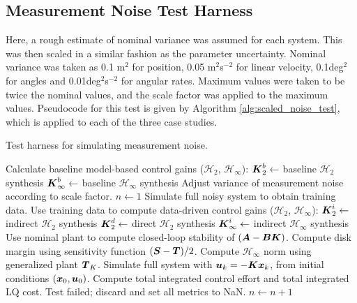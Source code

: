 \subsection{Measurement Noise Test Harness}
Here, a rough estimate of nominal variance was assumed for each system.  This was then scaled in a similar fashion as the parameter uncertainty.  Nominal variance was taken as 0.1 m$^{2}$ for position, 0.05 m$^{2}$s$^{-2}$ for linear velocity, 0.1deg$^{2}$ for angles and 0.01deg$^{2}$s$^{-2}$ for angular rates.  Maximum values were taken to be twice the nominal values, and the scale factor was applied to the maximum values.  Pseudocode for this test is given by Algorithm \ref{alg:scaled_noise_test}, which is applied to each of the three case studies.

\begin{algorithm}
\caption{Test harness for simulating measurement noise.}
\label{alg:scaled_noise_test}
\begin{algorithmic}
	\State Calculate baseline model-based control gains ($\mathcal{H}_{2}$, $\mathcal{H}_{\infty}$):
	\State \hspace{10pt} $\vb*{K}_{2}^{b} \gets $ baseline $\mathcal{H}_{2}$ synthesis
	\State \hspace{10pt} $\vb*{K}_{\infty}^{b} \gets $ baseline $\mathcal{H}_{\infty}$ synthesis
		\State Adjust variance of measurement noise according to scale factor.
		\State $n \gets 1$
			\State Simulate full noisy system to obtain training data.
			\State Use training data to compute data-driven control gains ($\mathcal{H}_{2}$, $\mathcal{H}_{\infty}$):
			\State \hspace{10pt} $\vb*{K}_{2}^{i} \gets $ indirect $\mathcal{H}_{2}$ synthesis
			\State \hspace{10pt} $\vb*{K}_{2}^{d} \gets $ direct $\mathcal{H}_{2}$ synthesis
			\State \hspace{10pt} $\vb*{K}_{\infty}^{i} \gets $ indirect $\mathcal{H}_{\infty}$ synthesis
				\State Use nominal plant to compute closed-loop stability of $(\vb*{A} - \vb*{B}\vb*{K})$.
					\State Compute disk margin using sensitivity function $(\vb*{S} - \vb*{T})/2$.
					\State Compute $\mathcal{H}_{\infty}$ norm using generalized plant $\vb*{T}_{K}$.
					\State Simulate full system with $\vb*{u}_{k} = -\vb*{K}\vb*{x}_{k}$, from initial conditions $(\vb*{x}_{0},\vb*{u}_{0})$.
					\State Compute total integrated control effort and total integrated LQ cost.
				\Else
					\State Test failed; discard and set all metrics to NaN.
				\EndIf
			\EndFor
		\State $n \gets n + 1$
		\EndWhile
	\EndFor
\end{algorithmic}
\end{algorithm}
